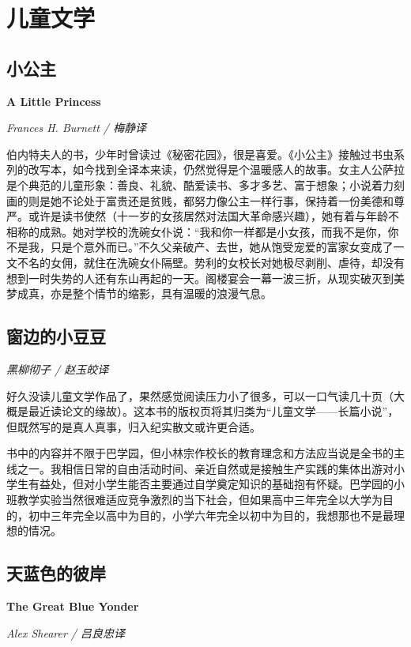 \section{儿童文学}

\subsection*{小公主}
\par \textbf{A Little Princess}
\par \emph{Frances H. Burnett / 梅静译} 
\par 伯内特夫人的书，少年时曾读过《秘密花园》，很是喜爱。《小公主》接触过书虫系列的改写本，如今找到全译本来读，仍然觉得是个温暖感人的故事。女主人公萨拉是个典范的儿童形象：善良、礼貌、酷爱读书、多才多艺、富于想象；小说着力刻画的则是她不论处于富贵还是贫贱，都努力像公主一样行事，保持着一份美德和尊严。或许是读书使然（十一岁的女孩居然对法国大革命感兴趣），她有着与年龄不相称的成熟。她对学校的洗碗女仆说：“我和你一样都是小女孩，而我不是你，你不是我，只是个意外而已。”不久父亲破产、去世，她从饱受宠爱的富家女变成了一文不名的女佣，就住在洗碗女仆隔壁。势利的女校长对她极尽剥削、虐待，却没有想到一时失势的人还有东山再起的一天。阁楼宴会一幕一波三折，从现实破灭到美梦成真，亦是整个情节的缩影，具有温暖的浪漫气息。
\par {}

\subsection*{窗边的小豆豆}
\par \emph{黑柳彻子 / 赵玉皎译} 
\par 好久没读儿童文学作品了，果然感觉阅读压力小了很多，可以一口气读几十页（大概是最近读论文的缘故）。这本书的版权页将其归类为“儿童文学——长篇小说”，但既然写的是真人真事，归入纪实散文或许更合适。
\par 书中的内容并不限于巴学园，但小林宗作校长的教育理念和方法应当说是全书的主线之一。我相信日常的自由活动时间、亲近自然或是接触生产实践的集体出游对小学生有益处，但对小学生能否主要通过自学奠定知识的基础抱有怀疑。巴学园的小班教学实验当然很难适应竞争激烈的当下社会，但如果高中三年完全以大学为目的，初中三年完全以高中为目的，小学六年完全以初中为目的，我想那也不是最理想的情况。
\par {}

\subsection*{天蓝色的彼岸}
\par \textbf{The Great Blue Yonder}
\par \emph{Alex Shearer / 吕良忠译} 

